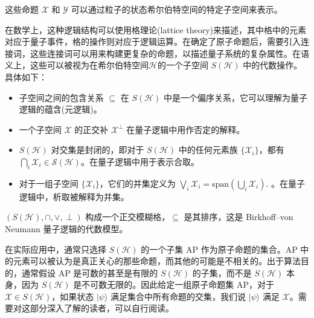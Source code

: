 这些命题 \( \mathcal{X} \) 和 \( \mathcal{Y} \) 可以通过粒子的状态希尔伯特空间的特定子空间来表示。

在数学上，这种逻辑结构可以使用格理论(lattice theory)来描述，其中格中的元素对应于量子事件，格的操作则对应于逻辑运算。在确定了原子命题后，需要引入连接词，这些连接词可以用来构建更复杂的命题，以描述量子系统的复杂属性。在语义上，这些可以被视为在希尔伯特空间$\mathcal{H}$的一个子空间 \(S(\mathcal{H})\) 中的代数操作。
具体如下：
\begin{itemize}
    \item 子空间之间的包含关系 \( \subseteq \) 在 \(S(\mathcal{H})\) 中是一个偏序关系，它可以理解为量子逻辑的蕴含(元逻辑)。
    \item 一个子空间 \( \mathcal{X} \) 的正交补 \( \mathcal{X}^\perp \) 在量子逻辑中用作否定的解释。
    \item \(S(\mathcal{H})\) 对交集是封闭的，即对于 \(S(\mathcal{H})\) 中的任何元素族 \( \{\mathcal{X}_i\} \)，都有$\bigcap_{i} \mathcal{X}_{i} \in \mathcal{S}(\mathcal{H})$。在量子逻辑中用于表示合取。
    \item 对于一组子空间 \(\{\mathcal{X}_i\}\)，它们的并集定义为
    \(
    \bigvee_i \mathcal{X}_i = \text{span} \left( \bigcup_i \mathcal{X}_i \right).
    \)
    。在量子逻辑中，析取被解释为并集。
\end{itemize}

\( (S(\mathcal{H}), \cap, \vee, \perp) \) 构成一个正交模糊格，\( \subseteq \) 是其排序，这是 Birkhoff–von Neumann 量子逻辑的代数模型。

在实际应用中，通常只选择 \( S(\mathcal{H}) \) 的一个子集 AP 作为原子命题的集合。AP 中的元素可以被认为是真正关心的那些命题，而其他的可能是不相关的。出于算法目的，通常假设 AP 是可数的甚至是有限的 \( S(\mathcal{H}) \) 的子集，而不是 \( S(\mathcal{H}) \) 本身，因为 \( S(\mathcal{H}) \) 是不可数无限的。因此给定一组原子命题集 AP，对于 \( \mathcal{X} \in S(\mathcal{H}) \)，如果状态 \(|\psi\rangle\) 满足集合中所有命题的交集，我们说 \(|\psi\rangle\) 满足 \(\mathcal{X}\)。需要对这部分深入了解的读者，可以自行阅读\citep{2021}。


